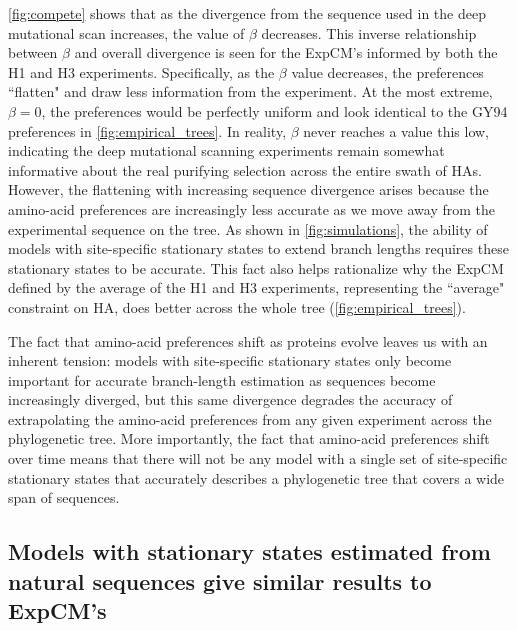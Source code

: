 \documentclass[11pt]{article}
\begin{document}
\ref{fig:compete} shows that as the divergence from the sequence used in the deep mutational scan increases, the value of $\beta$ decreases. 
This inverse relationship between $\beta$ and overall divergence is seen for the ExpCM's informed by both the H1 and H3 experiments.
Specifically, as the $\beta$ value decreases, the preferences ``flatten" and draw less information from the experiment. 
At the most extreme, $\beta = 0$, the preferences would be perfectly uniform and look identical to the GY94 preferences in \ref{fig:empirical_trees}.
In reality, $\beta$ never reaches a value this low, indicating the deep mutational scanning experiments remain somewhat informative about the real purifying selection across the entire swath of HAs. 
However, the flattening with increasing sequence divergence arises because the amino-acid preferences are increasingly less accurate as we move away from the experimental sequence on the tree.
As shown in \ref{fig:simulations}, the ability of models with site-specific stationary states to extend branch lengths requires these stationary states to be accurate.
This fact also helps rationalize why the ExpCM defined by the average of the H1 and H3 experiments, representing the ``average" constraint on HA, does better across the whole tree (\ref{fig:empirical_trees}). 
 
The fact that amino-acid preferences shift as proteins evolve leaves us with an inherent tension: models with site-specific stationary states only become important for accurate branch-length estimation as sequences become increasingly diverged, but this same divergence degrades the accuracy of extrapolating the amino-acid preferences from any given experiment across the phylogenetic tree.
More importantly, the fact that amino-acid preferences shift over time means that there will not be any model with a single set of site-specific stationary states that accurately describes a phylogenetic tree that covers a wide span of sequences.

\subsection*{Models with stationary states estimated from natural sequences give similar results to ExpCM's}
\end{document}
